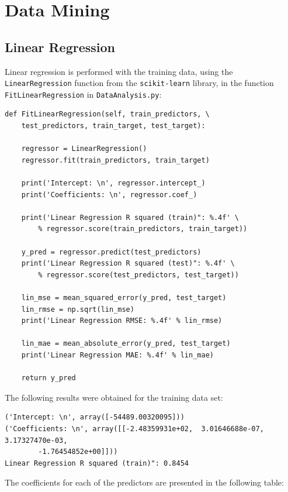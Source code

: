 \documentclass[11pt,a4paper,titlepage]{article}
\begin{document}
\section{Data Mining}
\subsection{Linear Regression}

Linear regression is performed with the training data, using the \texttt{LinearRegression} function from the \texttt{scikit-learn} library, in the function \texttt{FitLinearRegression} in \texttt{DataAnalysis.py}:

\begin{verbatim}
def FitLinearRegression(self, train_predictors, \
    test_predictors, train_target, test_target):

    regressor = LinearRegression()
    regressor.fit(train_predictors, train_target)

    print('Intercept: \n', regressor.intercept_)
    print('Coefficients: \n', regressor.coef_)

    print('Linear Regression R squared (train)": %.4f' \
        % regressor.score(train_predictors, train_target))

    y_pred = regressor.predict(test_predictors)
    print('Linear Regression R squared (test)": %.4f' \
        % regressor.score(test_predictors, test_target))

    lin_mse = mean_squared_error(y_pred, test_target)
    lin_rmse = np.sqrt(lin_mse)
    print('Linear Regression RMSE: %.4f' % lin_rmse)

    lin_mae = mean_absolute_error(y_pred, test_target)
    print('Linear Regression MAE: %.4f' % lin_mae)

    return y_pred
\end{verbatim}

The following results were obtained for the training data set:

\begin{verbatim}
('Intercept: \n', array([-54489.00320095]))
('Coefficients: \n', array([[-2.48359931e+02,  3.01646688e-07,  3.17327470e-03,
        -1.76454852e+00]]))
Linear Regression R squared (train)": 0.8454
\end{verbatim}

The coefficients for each of the predictors are presented in the following table:
\end{document}
